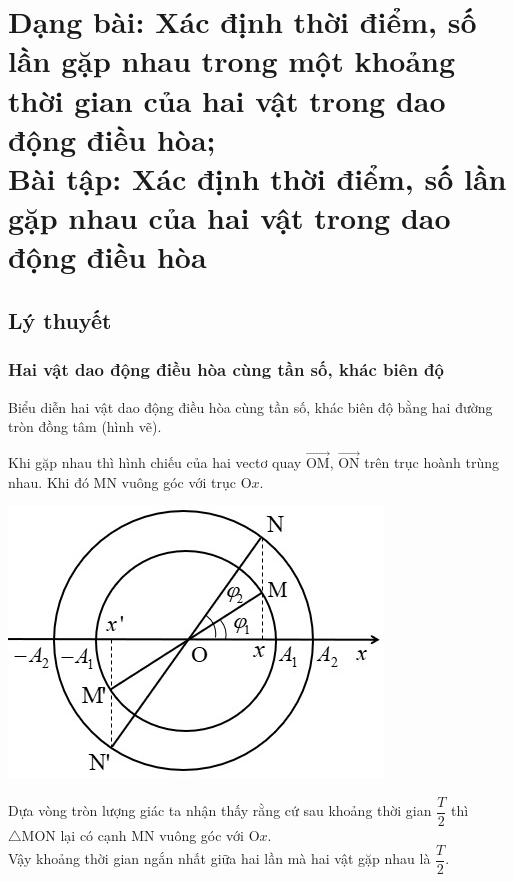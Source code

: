 
\chapter[Dạng bài: Xác định thời điểm, số lần gặp nhau trong một khoảng thời gian của hai vật trong dao động điều hòa;\\
Bài tập: Xác định thời điểm, số lần gặp nhau của hai vật trong dao động điều hòa]{Dạng bài: Xác định thời điểm, số lần gặp nhau trong một khoảng thời gian của hai vật trong dao động điều hòa;\\Bài tập: Xác định thời điểm, số lần gặp nhau của hai vật trong dao động điều hòa}
\section{Lý thuyết}
\subsection{Hai vật dao động điều hòa cùng tần số, khác biên độ}
Biểu diễn hai vật dao động điều hòa cùng tần số, khác biên độ bằng hai đường tròn đồng tâm (hình vẽ).

Khi gặp nhau thì hình chiếu của hai vectơ quay $\overrightarrow{\text{OM}}$, $\overrightarrow{\text{ON}}$ trên trục hoành trùng nhau. Khi đó MN vuông góc với trục $\text{O}x$.

\begin{center}
	\includegraphics[scale=0.8]{../figs/VN12-PH-02-A-001-5-V2-1.jpg}
\end{center}

Dựa vòng tròn lượng giác ta nhận thấy rằng cứ sau khoảng thời gian $\dfrac{T}{2}$ thì $\triangle\text{MON}$ lại có cạnh MN vuông góc với $\text{O}x$.\\
Vậy khoảng thời gian ngắn nhất giữa hai lần mà hai vật gặp nhau là $\dfrac{T}{2}$.

